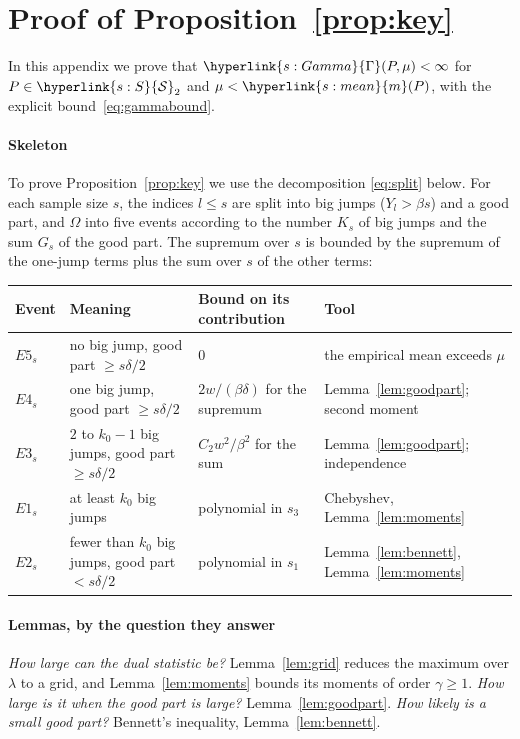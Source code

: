 \documentclass[11pt]{article}
\newcommand{\sy}[2]{{\hyperlink{#1}{#2}}}
\newcommand{\Sm}{\sy{s:S}{\mathcal{S}}}
\newcommand{\mean}{\sy{s:mean}{m}}
\newcommand{\Gam}{\sy{s:Gamma}{\Gamma}}
\begin{document}
\section{Proof of Proposition~\ref{prop:key}}\label{sec:proof-key}

In this appendix we prove that $\Gam(P,\mu)<\infty$ for $P\in\Sm_2$ and $\mu<\mean(P)$, with the explicit
bound~\eqref{eq:gammabound}.

\paragraph{Skeleton} To prove Proposition~\ref{prop:key} we use the decomposition \eqref{eq:split}
below. For each sample size $s$, the indices $l\le s$ are split into big jumps
($Y_l>\beta s$) and a good part, and $\Omega$ into five events according to the number $K_s$ of big
jumps and the sum $G_s$ of the good part. The supremum over $s$ is bounded by the supremum of the
one-jump terms plus the sum over $s$ of the other terms:

\begin{center}
\small
\begin{tabular}{@{}lp{}p{}p{}@{}}
\toprule
Event & Meaning & Bound on its contribution & Tool \\
\midrule
$E5_s$ & no big jump, good part $\ge s\delta/2$ & $0$ & the empirical mean exceeds $\mu$ \\
$E4_s$ & one big jump, good part $\ge s\delta/2$ & $2w/(\beta\delta)$ for the supremum & Lemma~\ref{lem:goodpart}; second moment \\
$E3_s$ & $2$ to $k_0-1$ big jumps, good part $\ge s\delta/2$ & $C_2w^2/\beta^2$ for the sum & Lemma~\ref{lem:goodpart}; independence \\
$E1_s$ & at least $k_0$ big jumps & polynomial in $s_3$ & Chebyshev, Lemma~\ref{lem:moments} \\
$E2_s$ & fewer than $k_0$ big jumps, good part $<s\delta/2$ & polynomial in $s_1$ & Lemma~\ref{lem:bennett}, Lemma~\ref{lem:moments} \\
\bottomrule
\end{tabular}
\end{center}

\paragraph{Lemmas, by the question they answer} \emph{How large can the dual statistic be?}
Lemma~\ref{lem:grid} reduces the maximum over $\lambda$ to a grid, and Lemma~\ref{lem:moments}
bounds its moments of order $\gamma\ge1$. \emph{How large is it when the good part is large?}
Lemma~\ref{lem:goodpart}. \emph{How likely is a small good part?} Bennett's inequality,
Lemma~\ref{lem:bennett}.
\end{document}
